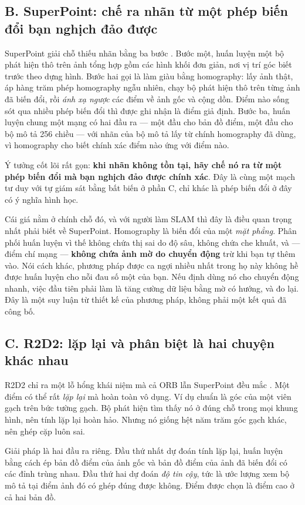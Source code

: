 \documentclass[../../deep_learning.tex]{subfiles}
\begin{document}
\subsection{B. SuperPoint: chế ra nhãn từ một phép biến đổi bạn nghịch đảo được}
SuperPoint giải chỗ thiếu nhãn bằng ba bước \cite{detone2018superpoint}. Bước một, huấn luyện một bộ phát hiện thô trên ảnh tổng hợp gồm các hình khối đơn giản, nơi vị trí góc biết trước theo dựng hình. Bước hai gọi là làm giàu bằng homography: lấy ảnh thật, áp hàng trăm phép homography ngẫu nhiên, chạy bộ phát hiện thô trên từng ảnh đã biến đổi, rồi \emph{ánh xạ ngược} các điểm về ảnh gốc và cộng dồn. Điểm nào sống sót qua nhiều phép biến đổi thì được ghi nhận là điểm giả định. Bước ba, huấn luyện chung một mạng có hai đầu ra --- một đầu cho bản đồ điểm, một đầu cho bộ mô tả 256 chiều --- với nhãn của bộ mô tả lấy từ chính homography đã dùng, vì homography cho biết chính xác điểm nào ứng với điểm nào.

Ý tưởng cốt lõi rất gọn: \textbf{khi nhãn không tồn tại, hãy chế nó ra từ một phép biến đổi mà bạn nghịch đảo được chính xác}. Đây là cùng một mạch tư duy với tự giám sát bằng bất biến ở phần C, chỉ khác là phép biến đổi ở đây có ý nghĩa hình học.

Cái giá nằm ở chính chỗ đó, và với người làm SLAM thì đây là điều quan trọng nhất phải biết về SuperPoint. Homography là biến đổi của một \emph{mặt phẳng}. Phân phối huấn luyện vì thế không chứa thị sai do độ sâu, không chứa che khuất, và --- điểm chí mạng --- \textbf{không chứa ảnh mờ do chuyển động} trừ khi bạn tự thêm vào. Nói cách khác, phương pháp được ca ngợi nhiều nhất trong họ này không hề được huấn luyện cho nỗi đau số một của bạn. Nếu định dùng nó cho chuyển động nhanh, việc đầu tiên phải làm là tăng cường dữ liệu bằng mờ có hướng, và đo lại. Đây là một suy luận từ thiết kế của phương pháp, không phải một kết quả đã công bố.

\subsection{C. R2D2: lặp lại và phân biệt là hai chuyện khác nhau}
R2D2 chỉ ra một lỗ hổng khái niệm mà cả ORB lẫn SuperPoint đều mắc \cite{revaud2019r2d2}. Một điểm có thể rất \emph{lặp lại} mà hoàn toàn vô dụng. Ví dụ chuẩn là góc của một viên gạch trên bức tường gạch. Bộ phát hiện tìm thấy nó ở đúng chỗ trong mọi khung hình, nên tính lặp lại hoàn hảo. Nhưng nó giống hệt năm trăm góc gạch khác, nên ghép cặp luôn sai.

Giải pháp là hai đầu ra riêng. Đầu thứ nhất dự đoán tính lặp lại, huấn luyện bằng cách ép bản đồ điểm của ảnh gốc và bản đồ điểm của ảnh đã biến đổi có các đỉnh trùng nhau. Đầu thứ hai dự đoán \emph{độ tin cậy}, tức là ước lượng xem bộ mô tả tại điểm ảnh đó có ghép đúng được không. Điểm được chọn là điểm cao ở cả hai bản đồ.
\end{document}
